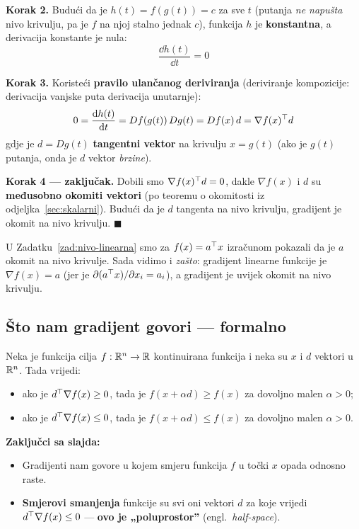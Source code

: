 \textbf{Korak 2.} Budući da je $h(t) = f(g(t)) = c$ za sve $t$ (putanja \emph{ne
napušta} nivo krivulju, pa je $f$ na njoj stalno jednak $c$), funkcija $h$ je
\textbf{konstantna}, a derivacija konstante je nula:
\[
\frac{\dd h(t)}{\dd t} = 0
\]

\textbf{Korak 3.} Koristeći \textbf{pravilo ulančanog deriviranja}
(deriviranje kompozicije: derivacija vanjske puta derivacija unutarnje):
\[
0 = \frac{\mathrm{d} h(t)}{\mathrm{d} t} = Df(g(t))\,Dg(t) = Df(x)\,d = \nabla f(x)^{\top} d
\]
gdje je $d = Dg(t)$ \textbf{tangentni vektor} na krivulju $x = g(t)$ (ako je
$g(t)$ putanja, onda je $d$ vektor \emph{brzine}).

\textbf{Korak 4 --- zaključak.} Dobili smo $\nabla f(x)^{\top} d = 0$, dakle
$\nabla f(x)$ i $d$ su \textbf{međusobno okomiti vektori} (po teoremu o
okomitosti iz odjeljka~\ref{sec:skalarni}). Budući da je $d$ tangenta na nivo
krivulju, gradijent je okomit na nivo krivulju. $\blacksquare$

\begin{napomena}
U Zadatku~\ref{zad:nivo-linearna} smo za $f(x) = a^{\top} x$ izračunom pokazali da
je $a$ okomit na nivo krivulje. Sada vidimo i \emph{zašto}: gradijent linearne
funkcije je $\nabla f(x) = a$ (jer je $\partial(a^{\top} x)/\partial x_i = a_i$), a
gradijent je uvijek okomit na nivo krivulju.
\end{napomena}

\subsection{Što nam gradijent govori --- formalno}

\begin{teorem}
Neka je funkcija cilja $f : \mathbb{R}^n \to \mathbb{R}$ kontinuirana funkcija i neka su $x$ i
$d$ vektori u $\mathbb{R}^n$. Tada vrijedi:
\begin{itemize}
  \item ako je $d^{\top}\nabla f(x) \ge 0$, tada je $f(x + \alpha d) \ge f(x)$ za
        dovoljno malen $\alpha > 0$;
  \item ako je $d^{\top}\nabla f(x) \le 0$, tada je $f(x + \alpha d) \le f(x)$ za
        dovoljno malen $\alpha > 0$.
\end{itemize}
\end{teorem}

\textbf{Zaključci sa slajda:}
\begin{itemize}
  \item Gradijenti nam govore u kojem smjeru funkcija $f$ u točki $x$ opada
        odnosno raste.
  \item \textbf{Smjerovi smanjenja} funkcije su svi oni vektori $d$ za koje
        vrijedi $d^{\top}\nabla f(x) \le 0$ --- \textbf{ovo je „poluprostor”}
        (engl.\ \emph{half-space}).
\end{itemize}

